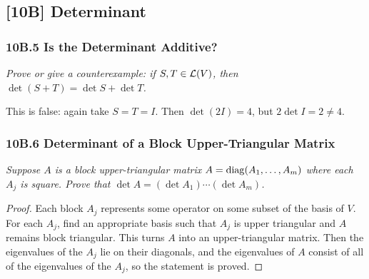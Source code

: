 \documentclass{article}
\begin{document}
\subsection*{[10B] Determinant}
\subsubsection*{10B.5 Is the Determinant Additive?}
\textit{Prove or give a counterexample: if $S,T\in\mathcal L (V)$, then $\det(S+T) = \det S + \det T$.}
\begin{solution}
This is false: again take $S=T=I$. Then $\det(2I) = 4$, but $2\det I = 2\neq 4$.
\end{solution}
\subsubsection*{10B.6 Determinant of a Block Upper-Triangular Matrix}
\textit{Suppose $A$ is a block upper-triangular matrix $A = \operatorname{diag}(A_1,\ldots, A_m)$ where each $A_j$ is square. Prove that $\det A = (\det A_1)\cdots (\det A_m)$.}
\begin{proof}
Each block $A_j$ represents some operator on some subset of the basis of $V$. For each $A_j$, find an appropriate basis such that $A_j$ is upper triangular and $A$ remains block triangular. This turns $A$ into an upper-triangular matrix. Then the eigenvalues of the $A_j$ lie on their diagonals, and the eigenvalues of $A$ consist of all of the eigenvalues of the $A_j$, so the statement is proved.
\end{proof}
\end{document}
